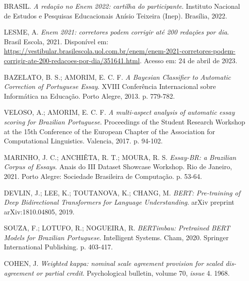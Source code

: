 \documentclass{article}
\begin{document}
\begin{thebibliography}{5}

  BRASIL. \emph{A redação no Enem 2022: cartilha do participante}. Instituto
  Nacional de Estudos e Pesquisas Educacionais Anísio Teixeira (Inep). Brasília,
  2022.

  LESME, A. \emph{Enem 2021: corretores podem corrigir até 200 redações por
  dia}. Brasil Escola, 2021. Disponível em:
  \url{https://vestibular.brasilescola.uol.com.br/enem/enem-2021-corretores-podem-corrigir-ate-200-redacoes-por-dia/351641.html}.
  Acesso em: 24 de abril de 2023.

  BAZELATO, B. S.; AMORIM, E. C. F. \emph{A Bayesian Classifier to Automatic
  Correction of Portuguese Essay}. XVIII Conferência Internacional sobre
  Informática na Educação. Porto Alegre, 2013. p. 779-782.

  VELOSO, A.; AMORIM, E. C. F.  \emph{A multi-aspect analysis of automatic essay
  scoring for Brazilian Portuguese}. Proceedings of the Student Research
  Workshop at the 15th Conference of the European Chapter of the Association for
  Computational Linguistics. Valencia, 2017. p. 94-102.

  MARINHO, J. C.; ANCHIÊTA, R. T.; MOURA, R. S. \emph{Essay-BR: a Brazilian
  Corpus of Essays}. Anais do III Dataset Showcase Workshop. Rio de Janeiro,
  2021. Porto Alegre: Sociedade Brasileira de Computação. p. 53-64.

  DEVLIN, J.; LEE, K.; TOUTANOVA, K.; CHANG, M. \emph{BERT: Pre-training of Deep
  Bidirectional Transformers for Language Understanding}. arXiv preprint
  arXiv:1810.04805, 2019.

  SOUZA, F.; LOTUFO, R.; NOGUEIRA, R. \emph{BERTimbau: Pretrained BERT Models
  for Brazilian Portuguese}. Intelligent Systems. Cham, 2020. Springer
  International Publishing. p. 403-417.

  COHEN, J. \emph{Weighted kappa:  nominal scale agreement provision for scaled
  dis-agreement or partial credit}. Psychological bulletin, volume 70,
  \textit{issue} 4. 1968.

\end{thebibliography}
\end{document}
